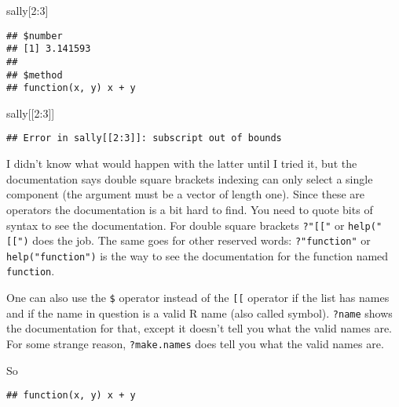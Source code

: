 \documentclass[
]{article}
\newenvironment{Shaded}{\begin{snugshade}}{\end{snugshade}}
\newcommand{\DecValTok}[1]{\textcolor[rgb]{0.00,0.00,0.81}{#1}}
\newcommand{\NormalTok}[1]{#1}
\newcommand{\SpecialCharTok}[1]{\textcolor[rgb]{0.00,0.00,0.00}{#1}}
\begin{document}
\begin{Shaded}
\begin{Highlighting}[]
\NormalTok{sally[}\DecValTok{2}\SpecialCharTok{:}\DecValTok{3}\NormalTok{]}
\end{Highlighting}
\end{Shaded}

\begin{verbatim}
## $number
## [1] 3.141593
## 
## $method
## function(x, y) x + y
\end{verbatim}

\begin{Shaded}
\begin{Highlighting}[]
\NormalTok{sally[[}\DecValTok{2}\SpecialCharTok{:}\DecValTok{3}\NormalTok{]]}
\end{Highlighting}
\end{Shaded}

\begin{verbatim}
## Error in sally[[2:3]]: subscript out of bounds
\end{verbatim}

I didn't know what would happen with the latter until I tried it, but
the documentation says double square brackets indexing can only select a
single component (the argument must be a vector of length one). Since
these are operators the documentation is a bit hard to find. You need to
quote bits of syntax to see the documentation. For double square
brackets \texttt{?"{[}{[}"} or \texttt{help("{[}{[}")} does the job. The
same goes for other reserved words: \texttt{?"function"} or
\texttt{help("function")} is the way to see the documentation for the
function named \texttt{function}.

One can also use the \texttt{\$} operator instead of the \texttt{{[}{[}}
operator if the list has names and if the name in question is a valid R
name (also called symbol). \texttt{?name} shows the documentation for
that, except it doesn't tell you what the valid names are. For some
strange reason, \texttt{?make.names} does tell you what the valid names
are.

So

\begin{Shaded}
\end{Shaded}

\begin{verbatim}
## function(x, y) x + y
\end{verbatim}
\end{document}
